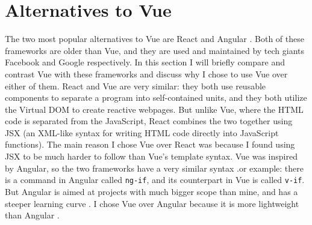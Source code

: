 \section{Alternatives to Vue}
\hspace{-0.25in}The two most popular alternatives to Vue are React and Angular 
\cite{angular-react-vue}. 
Both of these frameworks are older than Vue, and they are used and maintained by 
tech giants Facebook and Google respectively. 
In this section I will briefly compare and contrast Vue with these frameworks and 
discuss why I chose to use Vue over either of them. 
\newline\newline
React and Vue are very similar: 
they both use reusable components to separate a program into self-contained units,
and they both utilize the Virtual DOM to create reactive webpages. 
But unlike Vue, where the HTML code is separated from the JavaScript,
React combines the two together using JSX
(an XML-like syntax for writing HTML code directly into JavaScript functions). 
The main reason I chose Vue over React was because I found using JSX to be 
much harder to follow than Vue's template syntax.
\newline\newline
Vue was inspired by Angular, so the two frameworks have a very similar syntax 
.or example: there is a command in Angular called \texttt{ng-if},
and its counterpart in Vue is called \texttt{v-if}.
But Angular is aimed at projects with much bigger scope than mine, 
and has a steeper learning curve \cite{angular-react-vue}.
I chose Vue over Angular because it is more lightweight than Angular \cite{vue-comparison}.
